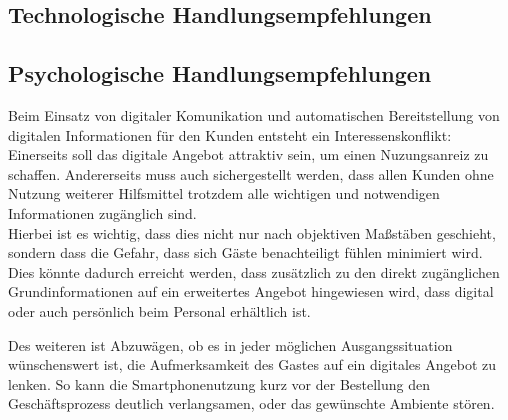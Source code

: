 \subsection{Technologische Handlungsempfehlungen} %
\label{sub:technologische_handlungsempfehlungen}


\subsection{Psychologische Handlungsempfehlungen} %
\label{sub:psychologische_handlungsempfehlungen}
Beim Einsatz von digitaler Komunikation und automatischen Bereitstellung von digitalen Informationen für den Kunden entsteht ein Interessenskonflikt: Einerseits soll das digitale Angebot attraktiv sein, um einen Nuzungsanreiz zu schaffen. Andererseits muss auch sichergestellt werden, dass allen Kunden ohne Nutzung weiterer Hilfsmittel trotzdem alle wichtigen und notwendigen Informationen zugänglich sind.\\
Hierbei ist es wichtig, dass dies nicht nur nach objektiven Maßstäben geschieht, sondern dass die Gefahr, dass sich Gäste benachteiligt fühlen minimiert wird. Dies könnte dadurch erreicht werden, dass zusätzlich zu den direkt zugänglichen Grundinformationen auf ein erweitertes Angebot hingewiesen wird, dass digital oder auch persönlich beim Personal erhältlich ist.

Des weiteren ist Abzuwägen, ob es in jeder möglichen Ausgangssituation wünschenswert ist, die Aufmerksamkeit des Gastes auf ein digitales Angebot zu lenken. So kann die Smartphonenutzung kurz vor der Bestellung den Geschäftsprozess deutlich verlangsamen, oder das gewünschte Ambiente stören. 


